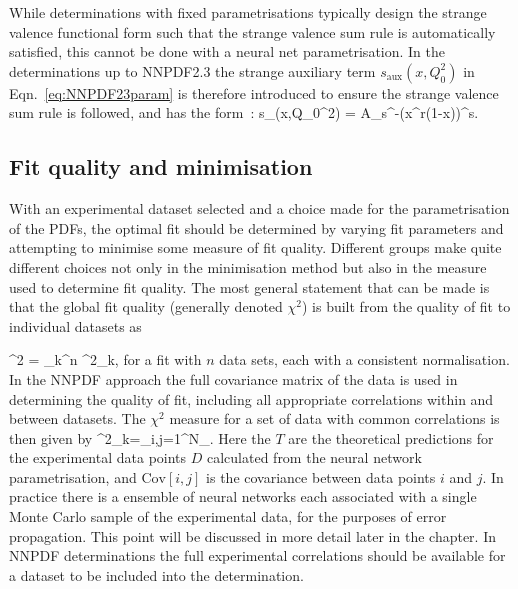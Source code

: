 While determinations with fixed parametrisations typically design the strange valence functional form such that the strange valence sum rule is automatically satisfied, this cannot be done with a neural net parametrisation. In the determinations up to NNPDF2.3 the strange auxiliary term $s_{\mathrm{aux}}(x,Q_0^2)$ in Eqn.~\ref{eq:NNPDF23param} is therefore introduced to ensure the strange valence sum rule is followed, and has the form~\cite{Ball:2009mk}:
\be s_{}(x,Q_0^2) = A_{s^-}(x^{r}(1-x))^s.\ee


\subsection{Fit quality and minimisation}
With an experimental dataset selected and a choice made for the parametrisation of the PDFs, the optimal fit should be determined by varying fit parameters and attempting to minimise some measure of fit quality. Different groups make quite different choices not only in the minimisation method but also in the measure used to determine fit quality. The most general statement that can be made is that the global fit quality (generally denoted $\chi^2$) is built from the quality of fit to individual datasets as

\be \chi^2 = \sum_k^{n} \chi^2_k,\ee
for a fit with $n$ data sets, each with a consistent normalisation. In the NNPDF approach the full covariance matrix of the data is used in determining the quality of fit, including all appropriate correlations within and between datasets. The $\chi^2$ measure for a set of data with common correlations is then given by
\be \chi^2_k=\sum_{i,j=1}^{N_{}}.\ee
Here the $T$ are the theoretical predictions for the experimental data points $D$ calculated from the neural network parametrisation, and $\mathrm{Cov}[i,j]$ is the covariance between data points $i$ and $j$. In practice there is a ensemble of neural networks each associated with a single Monte Carlo sample of the experimental data, for the purposes of error propagation. This point will be discussed in more detail later in the chapter.  In NNPDF determinations the full experimental correlations should be available for a dataset to be included into the determination.

